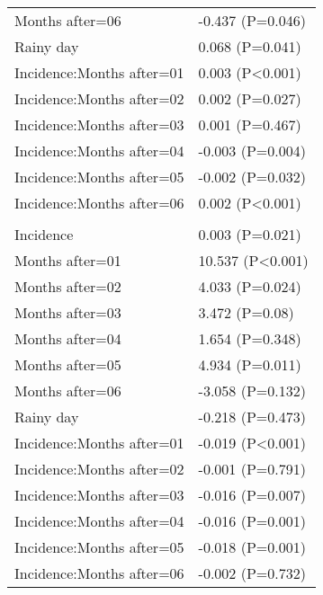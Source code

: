 \documentclass[]{article}
\begin{document}
\begin{longtable}[t]{ll}
\hspace{1em}Months after=06 & -0.437 (P=0.046)\\
\hspace{1em}Rainy day & 0.068 (P=0.041)\\
\hspace{1em}Incidence:Months after=01 & 0.003 (P<0.001)\\
\hspace{1em}Incidence:Months after=02 & 0.002 (P=0.027)\\
\hspace{1em}Incidence:Months after=03 & 0.001 (P=0.467)\\
\hspace{1em}Incidence:Months after=04 & -0.003 (P=0.004)\\
\hspace{1em}Incidence:Months after=05 & -0.002 (P=0.032)\\
\hspace{1em}Incidence:Months after=06 & 0.002 (P<0.001)\\
\addlinespace[1.5em]
\multicolumn{2}{l}{\textbf{Temporary not field worker}}\\
\hspace{1em}Incidence & 0.003 (P=0.021)\\
\hspace{1em}Months after=01 & 10.537 (P<0.001)\\
\hspace{1em}Months after=02 & 4.033 (P=0.024)\\
\hspace{1em}Months after=03 & 3.472 (P=0.08)\\
\hspace{1em}Months after=04 & 1.654 (P=0.348)\\
\hspace{1em}Months after=05 & 4.934 (P=0.011)\\
\hspace{1em}Months after=06 & -3.058 (P=0.132)\\
\hspace{1em}Rainy day & -0.218 (P=0.473)\\
\hspace{1em}Incidence:Months after=01 & -0.019 (P<0.001)\\
\hspace{1em}Incidence:Months after=02 & -0.001 (P=0.791)\\
\hspace{1em}Incidence:Months after=03 & -0.016 (P=0.007)\\
\hspace{1em}Incidence:Months after=04 & -0.016 (P=0.001)\\
\hspace{1em}Incidence:Months after=05 & -0.018 (P=0.001)\\
\hspace{1em}Incidence:Months after=06 & -0.002 (P=0.732)\\*
\end{longtable}
\end{document}
